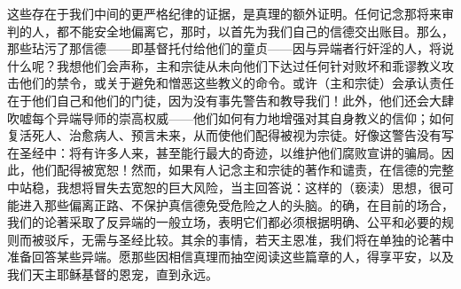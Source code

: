 这些存在于我们中间的更严格纪律的证据，是真理的额外证明。任何记念那将来审判的人，都不能安全地偏离它，那时，以首先为我们自己的信德交出账目。那么，那些玷污了那信德——即基督托付给他们的童贞——因与异端者行奸淫的人，将说什么呢？我想他们会声称，主和宗徒从未向他们下达过任何针对败坏和乖谬教义攻击他们的禁令，或关于避免和憎恶这些教义的命令。或许（主和宗徒）会承认责任在于他们自己和他们的门徒，因为没有事先警告和教导我们！此外，他们还会大肆吹嘘每个异端导师的崇高权威——他们如何有力地增强对其自身教义的信仰；如何复活死人、治愈病人、预言未来，从而使他们配得被视为宗徒。好像这警告没有写在圣经中：将有许多人来，甚至能行最大的奇迹，以维护他们腐败宣讲的骗局。因此，他们配得被宽恕！然而，如果有人记念主和宗徒的著作和谴责，在信德的完整中站稳，我想将冒失去宽恕的巨大风险，当主回答说：这样的（亵渎）思想，很可能进入那些偏离正路、不保护真信德免受危险之人的头脑。的确，在目前的场合，我们的论著采取了反异端的一般立场，表明它们都必须根据明确、公平和必要的规则而被驳斥，无需与圣经比较。其余的事情，若天主恩准，我们将在单独的论著中准备回答某些异端。愿那些因相信真理而抽空阅读这些篇章的人，得享平安，以及我们天主耶稣基督的恩宠，直到永远。\par


